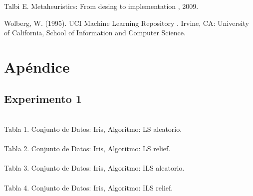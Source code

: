 \documentclass{ci5652}
\begin{document}
\begin{thebibliography}{99}
Talbi E.
\newblock Metaheuristics: From desing to implementation
, 2009.

Wolberg, W. (1995). UCI Machine Learning Repository
.
\newblock Irvine, CA: University of California, School of Information and Computer Science.

%
\end{thebibliography}


\newpage
\section*{Apéndice}
\small
\subsection*{Experimento 1}
%
\\
Tabla 1. Conjunto de Datos: Iris, Algoritmo: LS aleatorio.\\

%
\\
Tabla 2. Conjunto de Datos: Iris, Algoritmo: LS relief.\\

\begin{adjustbox}{width=\columnwidth, center=\columnwidth}
%
\\
\end{adjustbox}
Tabla 3. Conjunto de Datos: Iris, Algoritmo: ILS aleatorio.\\

\begin{adjustbox}{width=\columnwidth, center=\columnwidth}
%
\\
\end{adjustbox}
Tabla 4. Conjunto de Datos: Iris, Algoritmo: ILS relief.\\
\end{document}
